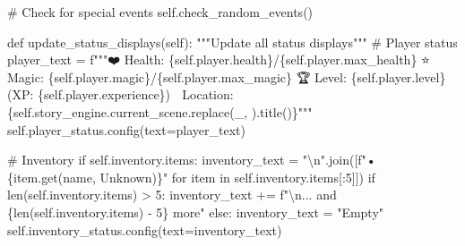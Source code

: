 \documentclass[
  letterpaper,
  DIV=11,
  numbers=noendperiod,
  oneside]{scrreprt}
\newenvironment{Shaded}{}{}
\newcommand{\BuiltInTok}[1]{\textcolor[rgb]{0.84,0.23,0.29}{#1}}
\newcommand{\CharTok}[1]{\textcolor[rgb]{0.01,0.18,0.38}{#1}}
\newcommand{\CommentTok}[1]{\textcolor[rgb]{0.42,0.45,0.49}{#1}}
\newcommand{\ControlFlowTok}[1]{\textcolor[rgb]{0.84,0.23,0.29}{#1}}
\newcommand{\DecValTok}[1]{\textcolor[rgb]{0.00,0.36,0.77}{#1}}
\newcommand{\KeywordTok}[1]{\textcolor[rgb]{0.84,0.23,0.29}{#1}}
\newcommand{\NormalTok}[1]{\textcolor[rgb]{0.14,0.16,0.18}{#1}}
\newcommand{\OperatorTok}[1]{\textcolor[rgb]{0.14,0.16,0.18}{#1}}
\newcommand{\SpecialCharTok}[1]{\textcolor[rgb]{0.00,0.36,0.77}{#1}}
\newcommand{\SpecialStringTok}[1]{\textcolor[rgb]{0.01,0.18,0.38}{#1}}
\newcommand{\StringTok}[1]{\textcolor[rgb]{0.01,0.18,0.38}{#1}}
\newcommand{\VariableTok}[1]{\textcolor[rgb]{0.89,0.38,0.04}{#1}}
\begin{document}
\begin{Shaded}
\begin{Highlighting}[]
        \CommentTok{\# Check for special events}
        \VariableTok{self}\NormalTok{.check\_random\_events()}
    
    \KeywordTok{def}\NormalTok{ update\_status\_displays(}\VariableTok{self}\NormalTok{):}
        \CommentTok{"""Update all status displays"""}
        \CommentTok{\# Player status}
\NormalTok{        player\_text }\OperatorTok{=} \SpecialStringTok{f"""❤️ Health: }\SpecialCharTok{\{}\VariableTok{self}\SpecialCharTok{.}\NormalTok{player}\SpecialCharTok{.}\NormalTok{health}\SpecialCharTok{\}}\SpecialStringTok{/}\SpecialCharTok{\{}\VariableTok{self}\SpecialCharTok{.}\NormalTok{player}\SpecialCharTok{.}\NormalTok{max\_health}\SpecialCharTok{\}}
\SpecialStringTok{⭐ Magic: }\SpecialCharTok{\{}\VariableTok{self}\SpecialCharTok{.}\NormalTok{player}\SpecialCharTok{.}\NormalTok{magic}\SpecialCharTok{\}}\SpecialStringTok{/}\SpecialCharTok{\{}\VariableTok{self}\SpecialCharTok{.}\NormalTok{player}\SpecialCharTok{.}\NormalTok{max\_magic}\SpecialCharTok{\}}
\SpecialStringTok{🏆 Level: }\SpecialCharTok{\{}\VariableTok{self}\SpecialCharTok{.}\NormalTok{player}\SpecialCharTok{.}\NormalTok{level}\SpecialCharTok{\}}\SpecialStringTok{ (XP: }\SpecialCharTok{\{}\VariableTok{self}\SpecialCharTok{.}\NormalTok{player}\SpecialCharTok{.}\NormalTok{experience}\SpecialCharTok{\}}\SpecialStringTok{)}
\SpecialStringTok{🧭 Location: }\SpecialCharTok{\{}\VariableTok{self}\SpecialCharTok{.}\NormalTok{story\_engine}\SpecialCharTok{.}\NormalTok{current\_scene}\SpecialCharTok{.}\NormalTok{replace(}\StringTok{\textquotesingle{}\_\textquotesingle{}}\NormalTok{, }\StringTok{\textquotesingle{} \textquotesingle{}}\NormalTok{)}\SpecialCharTok{.}\NormalTok{title()}\SpecialCharTok{\}}\SpecialStringTok{"""}
        \VariableTok{self}\NormalTok{.player\_status.config(text}\OperatorTok{=}\NormalTok{player\_text)}
        
        \CommentTok{\# Inventory}
        \ControlFlowTok{if} \VariableTok{self}\NormalTok{.inventory.items:}
\NormalTok{            inventory\_text }\OperatorTok{=} \StringTok{"}\CharTok{\textbackslash{}n}\StringTok{"}\NormalTok{.join([}\SpecialStringTok{f"• }\SpecialCharTok{\{}\NormalTok{item}\SpecialCharTok{.}\NormalTok{get(}\StringTok{\textquotesingle{}name\textquotesingle{}}\NormalTok{, }\StringTok{\textquotesingle{}Unknown\textquotesingle{}}\NormalTok{)}\SpecialCharTok{\}}\SpecialStringTok{"} 
                                      \ControlFlowTok{for}\NormalTok{ item }\KeywordTok{in} \VariableTok{self}\NormalTok{.inventory.items[:}\DecValTok{5}\NormalTok{]])}
            \ControlFlowTok{if} \BuiltInTok{len}\NormalTok{(}\VariableTok{self}\NormalTok{.inventory.items) }\OperatorTok{\textgreater{}} \DecValTok{5}\NormalTok{:}
\NormalTok{                inventory\_text }\OperatorTok{+=} \SpecialStringTok{f"}\CharTok{\textbackslash{}n}\SpecialStringTok{... and }\SpecialCharTok{\{}\BuiltInTok{len}\NormalTok{(}\VariableTok{self}\NormalTok{.inventory.items) }\OperatorTok{{-}} \DecValTok{5}\SpecialCharTok{\}}\SpecialStringTok{ more"}
        \ControlFlowTok{else}\NormalTok{:}
\NormalTok{            inventory\_text }\OperatorTok{=} \StringTok{"Empty"}
        \VariableTok{self}\NormalTok{.inventory\_status.config(text}\OperatorTok{=}\NormalTok{inventory\_text)}
        

\end{Highlighting}
\end{Shaded}
\end{document}
